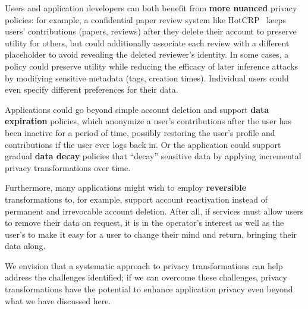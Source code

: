 Users and application developers can both benefit from \textbf{more nuanced} privacy policies:
%
for example, a confidential paper review system like HotCRP~\cite{hotcrp} keeps users'
contributions (papers, reviews) after they delete their account to preserve utility for others, but
could additionally associate each review with a different placeholder to avoid revealing the deleted
reviewer's identity.
%
In some cases, a policy could preserve utility while reducing the efficacy of later inference
attacks by \eg modifying sensitive metadata (\eg tags, creation times).
%
%
%
Individual users could even specify different preferences for their data.
%
%

%
Applications could go beyond simple account deletion and support \textbf{data
expiration} policies, which anonymize a user's contributions after the user has been inactive for a
period of time, possibly restoring the user's profile and contributions if the user ever logs back
in.
%
Or the application could support gradual \textbf{data decay} policies that ``decay'' sensitive data
by applying incremental privacy transformations over time.

Furthermore, many applications might wish to employ \textbf{reversible} transformations to, for
example, support account reactivation instead of permanent and irrevocable account deletion.
%
After all, if services must allow users to remove their data on request, it is in the operator's
interest as well as the user's to make it easy for a user to change their mind and return, bringing
their data along.

We envision that a systematic approach to privacy transformations can help address the challenges
identified; if we can overcome these challenges, privacy transformations have the potential to enhance application
privacy even beyond what we have discussed here.
